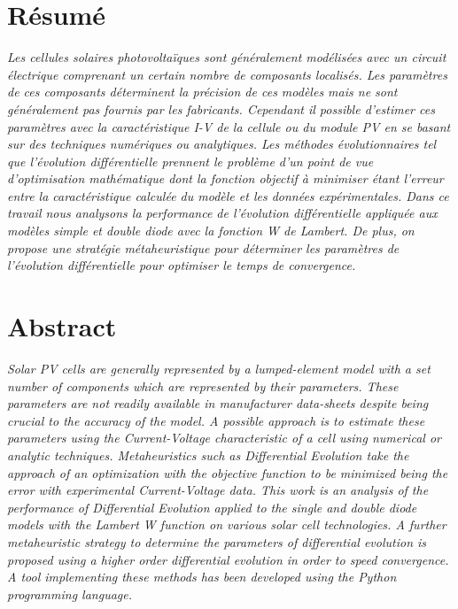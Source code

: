 \section*{Résumé}
\textit{Les cellules solaires photovoltaïques sont généralement modélisées avec un circuit électrique comprenant un certain nombre de composants localisés. Les paramètres de ces composants déterminent la précision de ces modèles mais ne sont généralement pas fournis par les fabricants. Cependant il possible d'estimer ces paramètres avec la caractéristique I-V de la cellule ou du module PV en se basant sur des techniques numériques ou analytiques. Les méthodes évolutionnaires tel que l'évolution différentielle prennent le problème d'un point de vue d'optimisation mathématique dont la fonction objectif à minimiser étant l'erreur entre la caractéristique calculée du modèle et les données expérimentales. Dans ce travail nous analysons la performance de l'évolution différentielle appliquée aux modèles simple et double diode avec la fonction W de Lambert. De plus, on propose une stratégie métaheuristique pour déterminer les paramètres de l'évolution différentielle pour optimiser le temps de convergence.
}
\section*{Abstract}
\textit{Solar PV cells are generally represented by a lumped-element model with a set number of components which are represented by their parameters. These parameters are not readily available in manufacturer data-sheets despite being crucial to the accuracy of the model. A possible approach is to estimate these parameters using the Current-Voltage characteristic of a cell using numerical or analytic techniques. Metaheuristics such as Differential Evolution take the approach of an optimization with the objective function to be minimized being the error with experimental Current-Voltage data. This work is an analysis of the performance of Differential Evolution applied to the single and double diode models with the Lambert W function on various solar cell technologies. A further metaheuristic strategy to determine the parameters of differential evolution is proposed using a higher order differential evolution in order to speed convergence. A tool implementing these methods has been developed using the Python programming language.}


\printnomenclature


